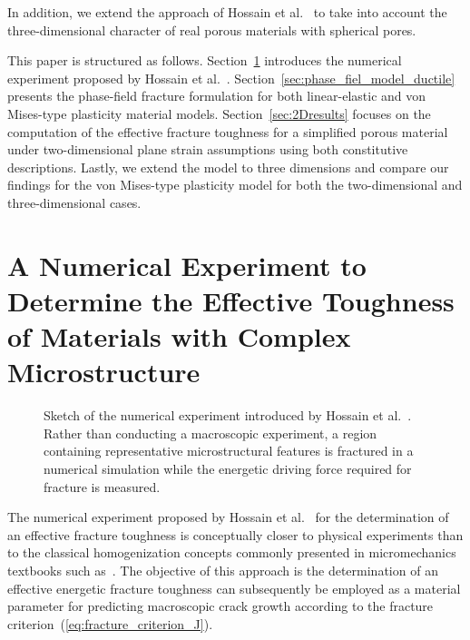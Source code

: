 \documentclass[pdflatex,sn-mathphys-num]{sn-jnl}%
\theoremstyle{thmstyleone}%
\theoremstyle{thmstyletwo}%
\theoremstyle{thmstylethree}%
\begin{document}
In addition, we extend the approach of Hossain et al.~\cite{hossain_effective_2014} to take into account the three-dimensional
character of real porous materials with spherical pores.

This paper is structured as follows.
Section~\ref{sec:numericalExperiment} introduces the numerical experiment
proposed by Hossain et al.~\cite{hossain_effective_2014}.
Section~\ref{sec:phase_fiel_model_ductile} presents the phase-field
fracture formulation for both linear-elastic and von Mises-type plasticity material models.
Section~\ref{sec:2Dresults} focuses on the computation
of the effective fracture toughness for a simplified porous material
under two-dimensional plane strain assumptions
 using both constitutive descriptions.
Lastly, we extend the model to three dimensions and compare our findings for the von Mises-type plasticity model
for both the two-dimensional and three-dimensional cases.




\section{A Numerical Experiment to Determine the Effective Toughness
 of Materials with Complex Microstructure}
\label{sec:numericalExperiment}


\begin{figure}[htb]
    \centering
    \resizebox{0.6\textwidth}{!}{}
    \caption{%
        Sketch of the numerical experiment introduced by Hossain et al.~\cite{hossain_effective_2014}. 
        Rather than conducting a macroscopic experiment, a region containing representative microstructural features is fractured in a numerical simulation while the energetic driving force required for fracture is measured.
    }
    \label{fig:numerical_experiment}
\end{figure}

The numerical experiment proposed by Hossain et al.~\cite{hossain_effective_2014} for the determination of an effective fracture toughness is conceptually closer to physical experiments than to the classical homogenization concepts commonly presented in micromechanics textbooks such as~\cite{gross_fracture_2011,nemat-nasser_micromechanics_2013}. 
The objective of this approach is the determination of an effective energetic fracture toughness can subsequently be employed as a material parameter for predicting macroscopic crack growth according to the fracture criterion~(\ref{eq:fracture_criterion_J}).
\end{document}
